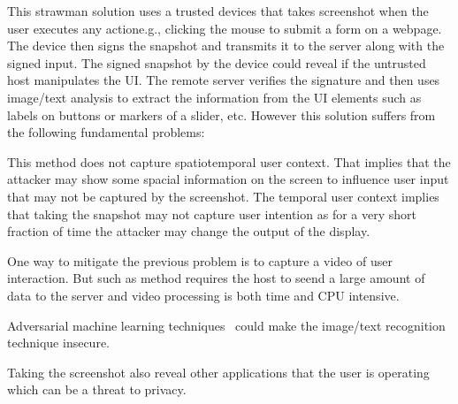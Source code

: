 This strawman solution uses a trusted devices that takes screenshot when the user executes any actione.g., clicking the mouse to submit a form on a webpage. The device then signs the snapshot and transmits it to the server along with the signed input. The signed snapshot by the device could reveal if the untrusted host manipulates the UI. The remote server verifies the signature and then uses image/text analysis to extract the information from the UI elements such as labels on buttons or markers of a slider, etc. However this solution suffers from the following fundamental problems:
\begin{mylist}
  \item This method does not capture spatiotemporal user context. That implies that the attacker may show some spacial information on the screen to influence user input that may not be captured by the screenshot. The temporal user context implies that taking the snapshot may not capture user intention as for a very short fraction of time the attacker may change the output of the display.
  \item One way to mitigate the previous problem is to capture a video of user interaction. But such as method requires the host to seend a large amount of data to the server and video processing is both time and CPU intensive. 
  \item Adversarial machine learning techniques~\cite{eykholt2017robust,sitawarin2018rogue} could make the image/text recognition technique insecure.
  \item Taking the screenshot also reveal other applications that the user is operating which can be a threat to privacy.
\end{mylist}

\fi

